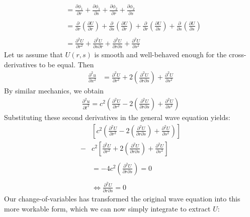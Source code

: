 \documentclass[12pt]{article}
\begin{document}
\begin{enumerate}[(a)]
{\begin{align*}
&= \frac{\partial \phi_1}{\partial r} + \frac{\partial \phi_1}{\partial s} + \frac{\partial \phi_2}{\partial r} + \frac{\partial \phi_2}{\partial s} \\ \\
&= \frac{\partial}{\partial r} \left( \frac{\partial U}{\partial r} \right) + \frac{\partial}{\partial s} \left( \frac{\partial U}{\partial r} \right) + \frac{\partial}{\partial r} \left( \frac{\partial U}{\partial s} \right) + \frac{\partial}{\partial s} \left( \frac{\partial U}{\partial s} \right) \\ \\
&= \frac{\partial^2 U}{\partial r^2} + \frac{\partial^2 U}{\partial s \partial r} + \frac{\partial^2 U}{\partial r \partial s} + \frac{\partial^2 U}{\partial s^2} 
\end{align*}
Let us assume that $U(r,s)$ is smooth and well-behaved enough for the cross-derivatives to be equal. Then
\begin{align*}
\frac{\partial^2 u}{\partial x^2} &= \frac{\partial^2 U}{\partial r^2} + 2 \left( \frac{\partial^2 U}{\partial r \partial s} \right) + \frac{\partial^2 U}{\partial s^2} 
\end{align*}
By similar mechanics, we obtain 
\begin{align*}
\frac{\partial^2 u}{\partial t^2} = c^2 \left( \frac{\partial^2 U}{\partial r^2} - 2 \left( \frac{\partial^2 U}{\partial r \partial s} \right) + \frac{\partial^2 U}{\partial s^2}  \right)
\end{align*}
Substituting these second derivatives in the general wave equation yields: \\
\begin{align*}
& \left[ c^2 \left( \frac{\partial^2 U}{\partial r^2} - 2 \left( \frac{\partial^2 U}{\partial r \partial s} \right) + \frac{\partial^2 U}{\partial s^2}  \right) \right] \\
-& c^2 \left[  \frac{\partial^2 U}{\partial r^2} + 2 \left( \frac{\partial^2 U}{\partial r \partial s} \right) + \frac{\partial^2 U}{\partial s^2}  \right] \\ \\
&=-4c^2 \left( \frac{\partial^2 U}{\partial r \partial s} \right) = 0 \\ \\
&\iff  \frac{\partial^2 U}{\partial r \partial s} = 0
\end{align*}
Our change-of-variables has transformed the original wave equation into this more workable form, which we can now simply integrate to extract $U$:
\begin{align*}

\end{align*}}
\end{enumerate}
\end{document}
